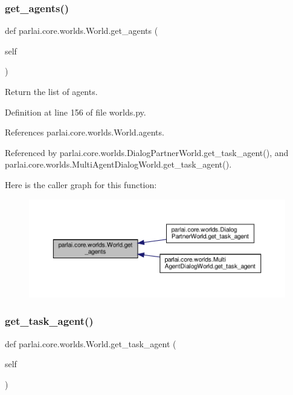 \subsubsection{\texorpdfstring{get\+\_\+agents()}{get\_agents()}}
{\footnotesize\ttfamily def parlai.\+core.\+worlds.\+World.\+get\+\_\+agents (\begin{DoxyParamCaption}\item[{}]{self }\end{DoxyParamCaption})}

\begin{DoxyVerb}Return the list of agents.\end{DoxyVerb}
 

Definition at line 156 of file worlds.\+py.



References parlai.\+core.\+worlds.\+World.\+agents.



Referenced by parlai.\+core.\+worlds.\+Dialog\+Partner\+World.\+get\+\_\+task\+\_\+agent(), and parlai.\+core.\+worlds.\+Multi\+Agent\+Dialog\+World.\+get\+\_\+task\+\_\+agent().

Here is the caller graph for this function\+:
\nopagebreak
\begin{figure}[H]
\begin{center}
\leavevmode
\includegraphics[width=350pt]{classparlai_1_1core_1_1worlds_1_1World_a1c74e607d064c5823e56b23b21ce17f0_icgraph}
\end{center}
\end{figure}
\mbox{\label{classparlai_1_1core_1_1worlds_1_1World_a25ccd7740aa992bb7055bf6549574a07}} 
\subsubsection{\texorpdfstring{get\+\_\+task\+\_\+agent()}{get\_task\_agent()}}
{\footnotesize\ttfamily def parlai.\+core.\+worlds.\+World.\+get\+\_\+task\+\_\+agent (\begin{DoxyParamCaption}\item[{}]{self }\end{DoxyParamCaption})}

